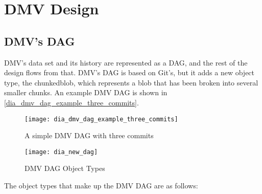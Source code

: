\chapter{DMV Design}


\section{DMV's DAG}

\gls{DMV}'s data set and its history are represented as a \gls{DAG}, and the
rest of the design flows from that. \gls{DMV}'s \gls{DAG} is based on Git's, but
it adds a new object type, the \gls{chunkedblob}, which represents a \gls{blob}
that has been broken into several smaller chunks. An example \gls{DMV} \gls{DAG}
is shown in \autoref{dia_dmv_dag_example_three_commits}.

\begin{figure}[p]
    \centering
    \texttt{[image: dia\_dmv\_dag\_example\_three\_commits]}
    \caption{A simple DMV DAG with three commits}
    \label{dia_dmv_dag_example_three_commits}
\end{figure}

\begin{figure}[p]
    \centering
        \texttt{[image: dia\_new\_dag]}
    \caption{DMV DAG Object Types}
    \label{fig:dia_new_dag}
\end{figure}

The object types that make up the \gls{DMV} \gls{DAG} are as follows:

